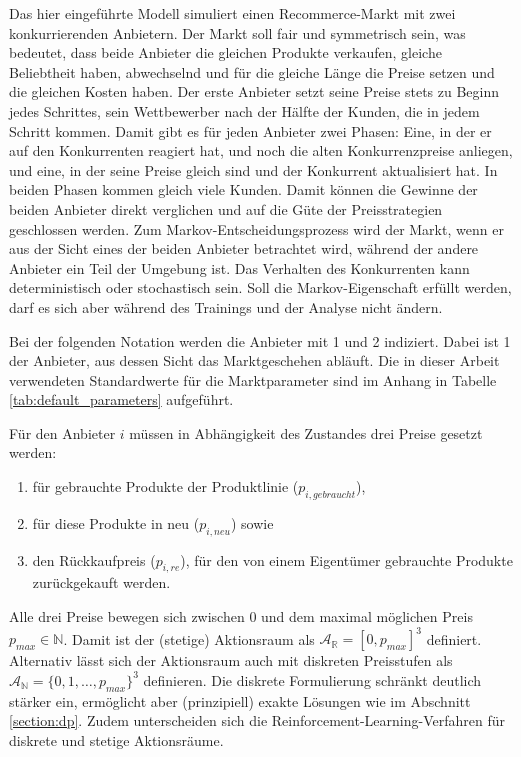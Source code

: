 Das hier eingeführte Modell simuliert einen Recommerce-Markt mit zwei konkurrierenden Anbietern.
Der Markt soll fair und symmetrisch sein, was bedeutet, dass beide Anbieter die gleichen Produkte verkaufen, gleiche Beliebtheit haben, abwechselnd und für die gleiche Länge die Preise setzen und die gleichen Kosten haben.
Der erste Anbieter setzt seine Preise stets zu Beginn jedes Schrittes, sein Wettbewerber nach der Hälfte der Kunden, die in jedem Schritt kommen.
Damit gibt es für jeden Anbieter zwei Phasen: Eine, in der er auf den Konkurrenten reagiert hat, und noch die alten Konkurrenzpreise anliegen, und eine, in der seine Preise gleich sind und der Konkurrent aktualisiert hat.
In beiden Phasen kommen gleich viele Kunden.
Damit können die Gewinne der beiden Anbieter direkt verglichen und auf die Güte der Preisstrategien geschlossen werden.
Zum Markov-Entscheidungsprozess wird der Markt, wenn er aus der Sicht eines der beiden Anbieter betrachtet wird, während der andere Anbieter ein Teil der Umgebung ist.
Das Verhalten des Konkurrenten kann deterministisch oder stochastisch sein.
Soll die Markov-Eigenschaft erfüllt werden, darf es sich aber während des Trainings und der Analyse nicht ändern.

Bei der folgenden Notation werden die Anbieter mit 1 und 2 indiziert.
Dabei ist 1 der Anbieter, aus dessen Sicht das Marktgeschehen abläuft.
Die in dieser Arbeit verwendeten Standardwerte für die Marktparameter sind im Anhang in Tabelle \ref{tab:default_parameters} aufgeführt.

Für den Anbieter $i$ müssen in Abhängigkeit des Zustandes drei Preise gesetzt werden:
\begin{enumerate}
	\item für gebrauchte Produkte der Produktlinie ($p_{i, gebraucht}$),
	\item für diese Produkte in neu ($p_{i, neu}$) sowie
	\item den Rückkaufpreis ($p_{i, re}$), für den von einem Eigentümer gebrauchte Produkte zurückgekauft werden.
\end{enumerate}
Alle drei Preise bewegen sich zwischen 0 und dem maximal möglichen Preis $p_{max} \in \mathbb{N}$.
Damit ist der (stetige) Aktionsraum als $\mathcal{A}_\mathbb{R}=[0, p_{max}]^3$ definiert.
Alternativ lässt sich der Aktionsraum auch mit diskreten Preisstufen als $\mathcal{A}_\mathbb{N}=\{0, 1, \ldots, p_{max}\}^3$ definieren.
Die diskrete Formulierung schränkt deutlich stärker ein, ermöglicht aber (prinzipiell) exakte Lösungen wie im Abschnitt \ref{section:dp}.
Zudem unterscheiden sich die Reinforcement-Learning-Verfahren für diskrete und stetige Aktionsräume.

